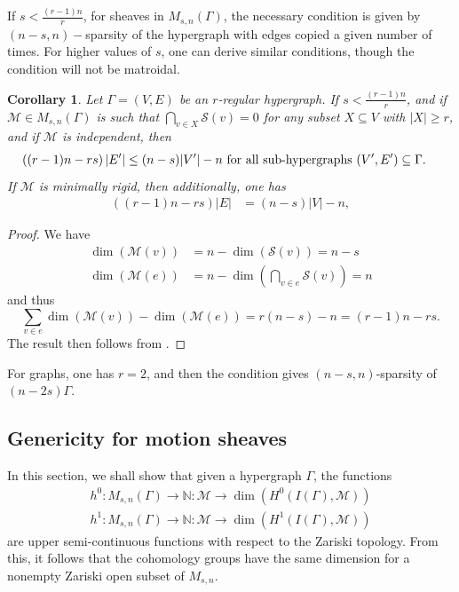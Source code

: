 \documentclass{article}
\newtheorem{corollary}[theorem]{Corollary}
\theoremstyle{definition}
\theoremstyle{remark}
\begin{document}
If $s < \frac{(r-1)n}{r}$, for sheaves in $M_{s, n}(\Gamma)$, the necessary condition is given by $(n-s, n)-$sparsity of the hypergraph with edges copied a given number of times. For higher values of $s$, one can derive similar conditions, though the condition will not be matroidal.  
\begin{corollary}\label{cor: necessary_concrete}
    Let $\Gamma=(V, E)$ be an $r$-regular hypergraph. If $s < \frac{(r-1)n}{r}$, and if $\mathcal{M}\in M_{s,n}(\Gamma)$ is such that $\bigcap_{v\in X} \mathcal{S}(v) = 0$ for any subset $X\subseteq V$ with $|X|\geq r$, and if $\mathcal{M}$ is independent, then
    \begin{align*}
        \left((r-1)n -rs\right) |E'| &\leq (n-s)|V'| - n \textup{ for all sub-hypergraphs $(V', E') \subseteq \Gamma$}.
    \end{align*}
    If $\mathcal{M}$ is minimally rigid, then additionally, one has
    \begin{align*}
        \left((r-1)n -rs\right) |E| &= (n-s)|V| - n,
    \end{align*}
\end{corollary}
\begin{proof}
    We have
    \begin{align*}
       \dim(\mathcal{M}(v))& = n -\dim(\mathcal{S}(v)) = n- s\\
        \dim(\mathcal{M}(e))& = n -\dim(\bigcap_{v\in e} \mathcal{S}(v)) = n
    \end{align*}
    and thus 
    \begin{equation*}
       \sum_{ v \in e} \dim(\mathcal{M}(v)) - \dim(\mathcal{M}(e))= r(n -s) -n = (r-1) n - rs.
    \end{equation*}
    The result then follows from .
\end{proof}
For graphs, one has $r=2$, and then the condition gives $(n-s, n)$-sparsity of $(n-2s)\Gamma$. 

\subsection{Genericity for motion sheaves}

In this section, we shall show that given a hypergraph $\Gamma$, the functions 
\begin{align*}
    h^{0}: M_{s,n}(\Gamma) \rightarrow \mathbb{N}: \mathcal{M} \rightarrow \dim(H^{0}(I(\Gamma), \mathcal{M}))\\
    h^{1}: M_{s,n}(\Gamma) \rightarrow \mathbb{N}: \mathcal{M} \rightarrow \dim(H^{1}(I(\Gamma), \mathcal{M}))
\end{align*}
are upper semi-continuous functions with respect to the Zariski topology. From this, it follows that the cohomology groups have the same dimension for a nonempty Zariski open subset of $M_{s,n}$.
\end{document}
